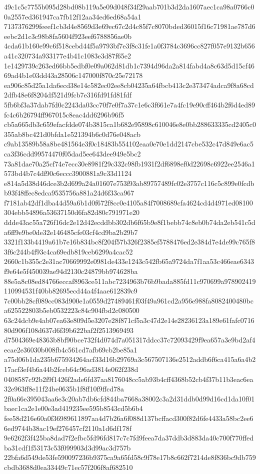 \documentclass[11pt,a4paper]{article}
\begin{document}
{49c1c5c7755b095d28bd08b119a5e09d048f34f29aab701b3d2da1607aec1ca98a0766c00a2557ed361947ca7fb12f12aa34ed6ed68a54a1
7137376299feeef1cb3d4e8569d3e69ec67c2d4c85f7c8070bded36015f16c71981ae787d6eebc2d1c3c98b8fa5604f923eef6788856ae0b
4cda61b160e99c6f518cebd44f5a9793bf7e3f8c31fe1a0f3784c3696cc827f057e9132b656a41c320734a933177e4b41c1083e3d87f65e2
1e1429739c263ed66bb5edbf0e09a062d81db1c7394d96da2a814fabd4a8c63d5d15cf4669ad4b1e03dd43a28506c147000f870c25e72178
ea906c85d25a1da6ecd38e14c582ec02ee8cb04235a64fbcb413c2e373474adca9f8a68cd2dfb48e6f8204df521d9fcb7e316fd91fd81fdf
5fb6bf3a37dab7fd0c2243da03cc70f7e0f7a37c1e6c3f661e7a4fc19e90cff464b2f6d4ed89fc4c6b26794ff967015c8eac4dd6296b96f5
cb5a665db3c659efacfdde074b3815ca1b682e95898c610046e8e0bb288633335cd2405c0355ab8bc421d0bfda1e521394b6c0d76e048acb
c9ab13589b58a8be481564e3f0c18483b554102eaa0e70e1dd2147cbe532c47d849e6ac5ca3f36cdd99574470f05dad5ee643dee949e5bc2
73a81dae70a25cf74e7ecc30e8981f29c332c98fb1931f2df6898ef0d22698c6922ee2546a1573bd4b7c4df90c6eccc3900881a9c33d1124
e814a5d38d46dce3b2d699a24a01607e753f93ab89757489fc02e3757c116c5c899e0fcdbb93f48ffec8edca9535756a881a24d6f33ca967
f7181ab42df1dba44d59a6b1d0f672f8cc0e4105a84f7008689cfa4624cd4d4971ed08100304ebb54896a53637150d6fa82d80c791971e20
ddde43ac55a726f16dc2e12d42ecddbb302db6f65b9e8f1bebb74c8eb0b74da2eb541c5da6ff9e9be0de32e146485cfe03cf4cd9ba2b29b7
3321f133b4419a61b7e16b834bc8f204f57b326f2385ef5788476ed2e384d7e4de99c765f83f6c244b4f93c4ca69edb819ceb6299a4cac52
2660c1b355c2e31ac70669992e0981de433e1243c542fb65a9724da7f1aa53c466eae6343f9e64e5f450039ae94d2130c24879bb974628ba
88e5a8c08ed84766eccaf8963ce511abc7234963b76b9bada885fd11c970699a978902419110994531f40bb82695ecd44a4f4aae612839c9
7c00bb28cf089cc083d900e1a0559d27489461f03f49a961cd2a956e988fa8082400480bca625522803b5eb0532223c84c904fbd2c080500
63c24dcb9e4ab07ea63e809d5e3207e28f871cf5a3c47d2e14e28236123a189e61fafc071680d906f108d637d6f39b622baf2f2513969493
d7504369e48363b8bf90bce732f4d074d7a051317ddcc37c72093429f9ea657a3e9bd2af4ecae2e36030b008fb4c561cd7afb69cb2be85a1
a75d06b1da235b675934264acf33d16b29769a3c567507136e2512addb6f6ca415a6a4b217acf3ef4b6a44b2fceb64c96ad3814e062f238d
0408587c92b2f9f1426f2ade6fd37aa8176048cc5ab93b4cff4368b52cb4f37b11b3eac6ea32e963ff8e11f24be0635b1f8ff10f9ffcd78a
2f0a66e395043aa6e3c20ab7db6cfd844ba7668a38002c3a2d31ddb0d99d16cd1da10f01baec1ca2e1e00e3ad419235ee595b8543cd5b6b4
fee58d216e60a0f36989611897aa4d7b26a6f088d137bcffacd300f82d6fe4433a58bc2ee66ed9744b38ac19ef276457cf2110a1d6df178f
9e6262f3f425ba8dad7f2efbc5fd96fd817c7c7fd9feea7da37ddb3d883da40c700f770ffedba31cdf1f53173c53f099903d3d99ac3d757b
22bfa6d549de53fe590097236b9375ca9a65fd58c9f78e17b8c662f7214de8f836bc9db759cbdb3688d0ea33449c71ec57f206f8af682510
}
\end{document}
